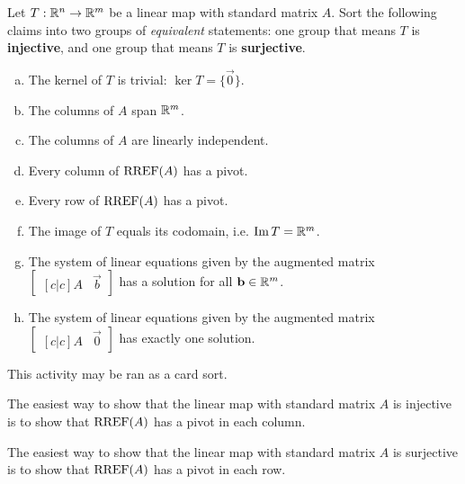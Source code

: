 \begin{applicationActivities}
\begin{activity}{15}
Let $T: \mathbb{R}^n \rightarrow \mathbb{R}^m$ be a linear map with standard matrix $A$.
Sort the following claims into two groups of \textit{equivalent} statements:
one group that means \(T\) is \textbf{injective}, and one group that means
\(T\) is \textbf{surjective}.
\begin{multicols}{2}
\begin{enumerate}[(a)]
\item The kernel of \(T\) is trivial: \(\ker T=\{\vec 0\}\).
\item The columns of $A$ span $\mathbb{R}^m$.
\item The columns of $A$ are linearly independent.
\item Every column of $\operatorname{RREF}(A)$ has a pivot.
\item Every row of $\operatorname{RREF}(A)$ has a pivot.
\item The image of \(T\) equals its codomain, i.e. \(\operatorname{Im} T=\mathbb{R}^m\).
\item The system of linear equations given by the augmented matrix $\begin{bmatrix}[c|c]A & \vec{b} \end{bmatrix}$ has a solution for all $\mathbf{b} \in \mathbb{R}^m$.
\item The system of linear equations given by the augmented matrix $\begin{bmatrix}[c|c] A & \vec{0} \end{bmatrix}$ has exactly one solution.
\end{enumerate}
\end{multicols}
\begin{instructorNote}
  This activity may be ran as a card sort.
\end{instructorNote}
\end{activity}

\begin{observation}
  The easiest way to show that the linear map with standard matrix \(A\)
  is injective is to show that \(\operatorname{RREF}(A)\) has a pivot in each column.

  \vspace{1em}

  The easiest way to show that the linear map with standard matrix \(A\)
  is surjective is to show that \(\operatorname{RREF}(A)\) has a pivot in each row.
\end{observation}


\end{applicationActivities}
